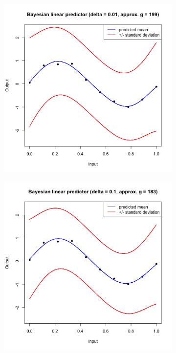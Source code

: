 \documentclass[a4paper, 11pt]{article}
\begin{document}
\begin{figure}[H]
\centering
\begin{subfigure}{.5\textwidth}
  \centering
  \includegraphics[width=1\linewidth]{ps3F_plot3_3.png}
\end{subfigure}%
\begin{subfigure}{.5\textwidth}
  \centering
  \includegraphics[width=1\linewidth]{ps3F_plot3_4.png}
\end{subfigure}
\end{figure}
\end{document}

